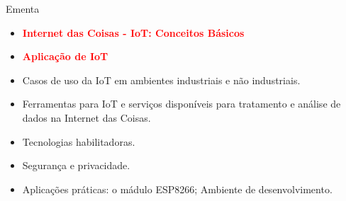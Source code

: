
\begin{frame}{Ementa}
    \begin{itemize}
        \item \textcolor{red}{\textbf{Internet das Coisas - IoT: Conceitos Básicos}}
        \item \textcolor{red}{\textbf{Aplicação de IoT}}
        \item Casos de uso da IoT em ambientes industriais e não industriais.
        \item Ferramentas para IoT e serviços disponíveis para tratamento e análise de dados na Internet das Coisas.
        \item Tecnologias habilitadoras.
        \item Segurança e privacidade.
        \item Aplicações práticas: o mádulo ESP8266; Ambiente de desenvolvimento.
    \end{itemize}
\end{frame}
